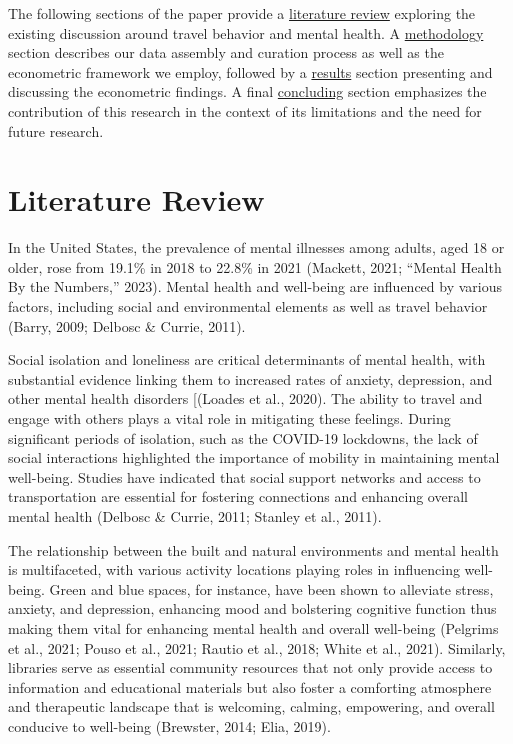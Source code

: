 \documentclass[
  letterpaper,
  number,
  review,
  3p]{elsarticle}
\begin{document}
The following sections of the paper provide a
\href{@sec-litreview}{literature review} exploring the existing
discussion around travel behavior and mental health. A
\href{@sec-methods}{methodology} section describes our data assembly and
curation process as well as the econometric framework we employ,
followed by a \href{@sec-results}{results} section presenting and
discussing the econometric findings. A final
\href{@sec-conclude}{concluding} section emphasizes the contribution of
this research in the context of its limitations and the need for future
research.


\section{Literature Review}\label{sec-litreview}

In the United States, the prevalence of mental illnesses among adults,
aged 18 or older, rose from 19.1\% in 2018 to 22.8\% in 2021 (Mackett,
2021; {``Mental {Health By} the {Numbers},''} 2023). Mental health and
well-being are influenced by various factors, including social and
environmental elements as well as travel behavior (Barry, 2009; Delbosc
\& Currie, 2011).

Social isolation and loneliness are critical determinants of mental
health, with substantial evidence linking them to increased rates of
anxiety, depression, and other mental health disorders {[}(Loades et
al., 2020). The ability to travel and engage with others plays a vital
role in mitigating these feelings. During significant periods of
isolation, such as the COVID-19 lockdowns, the lack of social
interactions highlighted the importance of mobility in maintaining
mental well-being. Studies have indicated that social support networks
and access to transportation are essential for fostering connections and
enhancing overall mental health (Delbosc \& Currie, 2011; Stanley et
al., 2011).

The relationship between the built and natural environments and mental
health is multifaceted, with various activity locations playing roles in
influencing well-being. Green and blue spaces, for instance, have been
shown to alleviate stress, anxiety, and depression, enhancing mood and
bolstering cognitive function thus making them vital for enhancing
mental health and overall well-being (Pelgrims et al., 2021; Pouso et
al., 2021; Rautio et al., 2018; White et al., 2021). Similarly,
libraries serve as essential community resources that not only provide
access to information and educational materials but also foster a
comforting atmosphere and therapeutic landscape that is welcoming,
calming, empowering, and overall conducive to well-being (Brewster,
2014; Elia, 2019).
\end{document}
